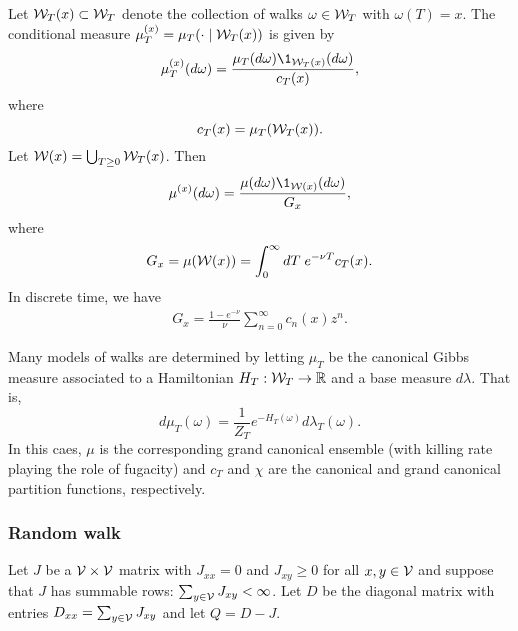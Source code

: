 Let $\mathcal{W}_T(x) \subset \mathcal{W}_T$ denote the collection of walks $\omega \in \mathcal{W}_T$
with $\omega(T) = x$. The conditional measure $\mu^{(x)}_T = \mu_T(\cdot \mid \mathcal{W}_T(x))$
is given by
\begin{equation}
\mu^{(x)}_T(d\omega) = \frac{\mu_T(d\omega) \1_{\Wcal_T(x)}(d\omega)}{c_T(x)},
\end{equation}
where
\begin{equation}
c_T(x) = \mu_T(\mathcal{W}_T(x)).
\end{equation}
Let $\mathcal{W}(x) = \bigcup_{T \ge 0} \mathcal{W}_T(x)$. Then
\begin{equation}
\mu^{(x)}(d\omega) = \frac{\mu(d\omega) \1_{\Wcal(x)}(d\omega)}{G_x},
\end{equation}
where
\begin{equation}
G_x = \mu(\mathcal{W}(x)) = \int_0^\infty dT \; e^{-\nu T} c_T(x).
\end{equation}
In discrete time, we have
\begin{align}
G_x = \frac{1 - e^{-\nu}}{\nu} \sum_{n=0}^\infty c_n(x) z^n.
\end{align}

Many models of walks are determined by letting $\mu_T$ be the canonical Gibbs measure
associated to a Hamiltonian $H_T : \mathcal{W}_T \rightarrow {\mathbb R}$ and a base measure $d\lambda$. That is,
\begin{equation}
d\mu_T(\omega) = \frac{1}{Z_T} e^{-H_T(\omega)} d\lambda_T(\omega).
\end{equation}
In this caes, $\mu$ is the corresponding grand canonical ensemble (with killing rate playing
the role of fugacity) and $c_T$ and $\chi$
are the canonical and grand canonical partition functions, respectively.



\subsubsection{Random walk}

Let $J$ be a $\mathcal{V} \times \mathcal{V}$
matrix with $J_{xx} = 0$ and $J_{xy} \ge 0$ for all $x, y \in \mathcal{V}$ and suppose
that $J$ has summable rows: $\sum_{y\in\mathcal{V}} J_{xy} < \infty$. Let $D$ be
the diagonal matrix with entries $D_{xx} = \sum_{y\in\mathcal{V}} J_{xy}$
and let $Q = D - J$.

